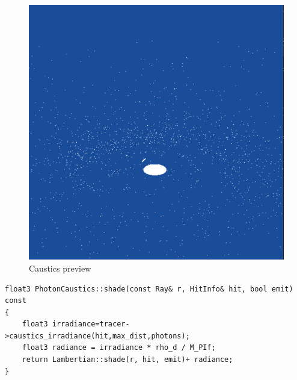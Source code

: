 \begin{figure}[H]
	\centering
	\includegraphics[scale=\imagescale]{images/worksheet_7/caustics_preview}
	\caption{Caustics preview}
	\label{fig:caustics_preview}
\end{figure}

\begin{lstlisting}
float3 PhotonCaustics::shade(const Ray& r, HitInfo& hit, bool emit) const
{	
	float3 irradiance=tracer->caustics_irradiance(hit,max_dist,photons);
	float3 radiance = irradiance * rho_d / M_PIf;
	return Lambertian::shade(r, hit, emit)+ radiance;
}
\end{lstlisting}

